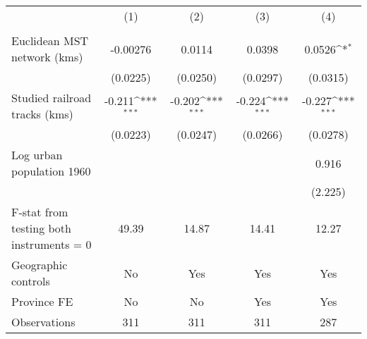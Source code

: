 {
\def\sym#1{\ifmmode^{#1}\else\(^{#1}\)\fi}
\begin{tabular}{l*{4}{c}}
\hline\hline
                &\multicolumn{1}{c}{(1)}&\multicolumn{1}{c}{(2)}&\multicolumn{1}{c}{(3)}&\multicolumn{1}{c}{(4)}\\
                &\multicolumn{1}{c}{}&\multicolumn{1}{c}{}&\multicolumn{1}{c}{}&\multicolumn{1}{c}{}\\
\hline
Euclidean MST network (kms)& -0.00276         &   0.0114         &   0.0398         &   0.0526\sym{*}  \\
                & (0.0225)         & (0.0250)         & (0.0297)         & (0.0315)         \\
[1em]
Studied railroad tracks (kms)&   -0.211\sym{***}&   -0.202\sym{***}&   -0.224\sym{***}&   -0.227\sym{***}\\
                & (0.0223)         & (0.0247)         & (0.0266)         & (0.0278)         \\
[1em]
Log urban population 1960&                  &                  &                  &    0.916         \\
                &                  &                  &                  &  (2.225)         \\
\hline
F-stat from testing both instruments = 0&    49.39         &    14.87         &    14.41         &    12.27         \\
Geographic controls&       No         &      Yes         &      Yes         &      Yes         \\
Province FE     &       No         &       No         &      Yes         &      Yes         \\
Observations    &      311         &      311         &      311         &      287         \\
\hline\hline
\end{tabular}
}
